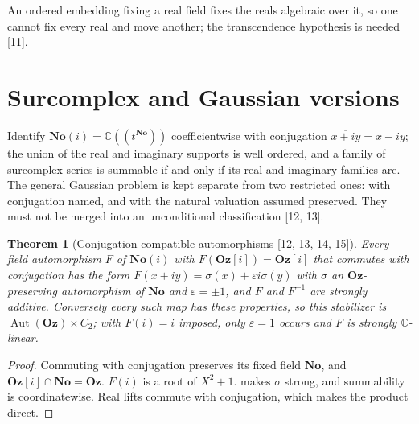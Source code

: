 \documentclass[11pt,oneside]{article}
\numberwithin{equation}{section}
\newtheorem{theorem}{Theorem}[section]
\theoremstyle{definition}
\theoremstyle{remark}
\newcommand{\No}{\mathbf{No}}
\newcommand{\Oz}{\mathbf{Oz}}
\newcommand{\Og}{\mathbf{Oz}[i]}
\newcommand{\SC}{\mathbf{No}(i)}
\newcommand{\C}{\mathbb C}
\newcommand{\Aut}{\operatorname{Aut}}
\newcommand{\Hahn}[2]{#1((t^{#2}))}
\newcommand{\src}[1]{\textup{\textsf{\small[#1]}}}
\begin{document}
An ordered embedding fixing a real field fixes the reals algebraic over it, so one cannot fix every real and move
another; the transcendence hypothesis is needed \src{11}.

\section{Surcomplex and Gaussian versions}\label{opa:as:sec:complex}

Identify $\SC=\Hahn\C\No$ coefficientwise with conjugation $\overline{x+iy}=x-iy$; the union of the real and
imaginary supports is well ordered, and a family of surcomplex series is summable if and only if its real and
imaginary families are. The general Gaussian problem is kept separate from two restricted ones: with conjugation
named, and with the natural valuation assumed preserved. They must not be merged into an unconditional
classification \src{12, 13}.

\begin{theorem}[Conjugation-compatible automorphisms \src{12, 13, 14, 15}]\label{opa:as:thm:conjugation}
Every field automorphism $F$ of $\SC$ with $F(\Og)=\Og$ that commutes with conjugation has the form
$F(x+iy)=\sigma(x)+\varepsilon i\sigma(y)$ with $\sigma$ an $\Oz$-preserving automorphism of $\No$ and
$\varepsilon=\pm1$, and $F$ and $F^{-1}$ are strongly additive. Conversely every such map has these properties, so
this stabilizer is $\Aut(\Oz)\times C_2$; with $F(i)=i$ imposed, only $\varepsilon=1$ occurs and $F$ is strongly
$\C$-linear.
\end{theorem}
\begin{proof}
Commuting with conjugation preserves its fixed field $\No$, and $\Og\cap\No=\Oz$. $F(i)$ is a root of $X^2+1$.
 makes $\sigma$ strong, and summability is coordinatewise. Real lifts commute with
conjugation, which makes the product direct.
\end{proof}
\end{document}
